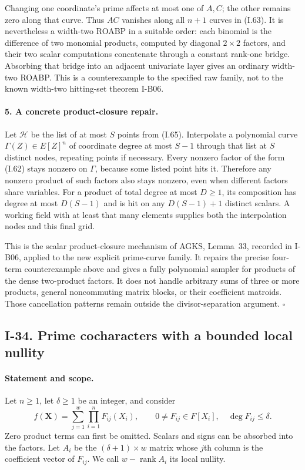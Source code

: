 \documentclass[11pt,a4paper]{article}
\theoremstyle{definition}\newtheorem{definition}{Definition}
\begin{document}
Changing one coordinate's prime affects at most one of
$A,C$; the other remains zero along that curve.  Thus
$AC$ vanishes along all $n+1$ curves in (I.63).
It is nevertheless a width-two ROABP in a suitable order:
each binomial is the difference of two monomial products,
computed by diagonal $2\times2$ factors, and their two
scalar computations concatenate through a constant
rank-one bridge.  Absorbing that bridge into an adjacent
univariate layer gives an ordinary width-two ROABP.
This is a counterexample to the specified raw family,
not to the known width-two hitting-set theorem I-B06.

\paragraph{5. A concrete product-closure repair.}
Let $\mathcal H$ be the list of at most $S$ points from
(I.65).  Interpolate a polynomial curve
$\Gamma(Z)\in E[Z]^n$ of coordinate degree at most $S-1$
through that list at $S$ distinct nodes, repeating points
if necessary.  Every nonzero factor of the form (I.62)
stays nonzero on $\Gamma$, because some listed point hits it.
Therefore any nonzero product of such factors also stays
nonzero, even when different factors share variables.
For a product of total degree at most $D\ge1$, its
composition has degree at most $D(S-1)$ and is hit on any
$D(S-1)+1$ distinct scalars.  A working field with at least
that many elements supplies both the interpolation nodes
and this final grid.

This is the scalar product-closure mechanism of AGKS,
Lemma~33, recorded in I-B06, applied to the new explicit
prime-curve family.  It repairs the precise four-term
counterexample above and gives a fully polynomial sampler
for products of the dense two-product factors.  It does
not handle arbitrary sums of three or more products,
general noncommuting matrix blocks, or their coefficient
matroids.  Those cancellation patterns remain outside
the divisor-separation argument.
\hfill$\square$


\subsection{I-34. Prime cocharacters with a bounded local nullity}
\label{I-34}

\paragraph{Statement and scope.}
Let $n\ge1$, let $\delta\ge1$ be an integer, and consider
\[
 f(\mathbf X)=\sum_{j=1}^{w}\prod_{i=1}^{n}F_{ij}(X_i),
 \qquad 0\ne F_{ij}\in F[X_i],\quad \deg F_{ij}\le\delta.
 \tag{I.67}
\]
Zero product terms can first be omitted. Scalars and signs can be
absorbed into the factors. Let $A_i$ be the $(\delta+1)\times w$
matrix whose $j$th column is the coefficient vector of $F_{ij}$.
We call $w-\operatorname{rank}A_i$ its local nullity.
\end{document}
